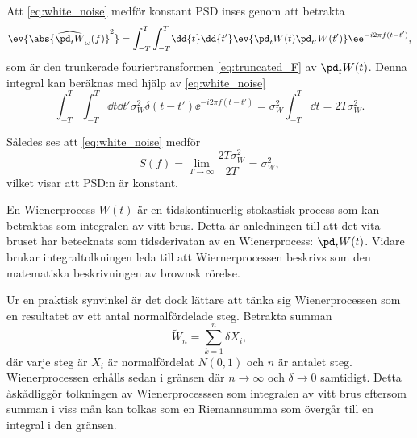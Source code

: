 Att \eqref{eq:white_noise} medför konstant PSD inses genom att betrakta
\begin{equation}
    \ev{\abs{\widehat{\pd_tW}_\omega(f)}^2} =
    \int_{-T}^{T}\int_{-T}^{T}\!\dd{t}\dd{t'}
    \ev{\pd_tW(t)\pd_{t'}W(t')}\ee^{-i2\pi f(t-t')},
\end{equation}
som är den trunkerade fouriertransformen \eqref{eq:truncated_F} av $\pd_tW(t)$. Denna integral kan beräknas med hjälp av \eqref{eq:white_noise}
\begin{equation}
    \int_{-T}^{T}\int_{-T}^{T}\!\dd{t}\dd{t'} 
    \sigma_W^2 \delta(t-t')\ee^{-i2\pi f(t-t')} 
    = \sigma_W^2 \int_{-T}^{T}\dd{t} =2T\sigma_W^2.
\end{equation}

Således ses att \eqref{eq:white_noise} medför 
\begin{equation} \label{eq:white-noise_PSD}
    S(f) = \lim_{T\to\infty}\dfrac{2T\sigma_W^2}{2T} = \sigma_W^2,
\end{equation}
vilket visar att PSD:n är konstant. 



En Wienerprocess $W(t)$ är en tidskontinuerlig stokastisk process som kan betraktas som integralen av vitt brus\cite{Miller_probability2012}. Detta är anledningen till att det vita bruset har betecknats som tidsderivatan av en Wienerprocess: $\pd_tW(t)$. Vidare brukar integraltolkningen leda till att Wiernerprocessen beskrivs som den matematiska beskrivningen av brownsk rörelse. 

Ur en praktisk synvinkel är det dock lättare att tänka sig Wienerprocessen som en resultatet av ett antal normalfördelade steg. Betrakta summan
\begin{equation}\label{eq:wiener_approx}
\tilde{W}_n = \sum_{k=1}^{n} \delta X_i,
\end{equation}
där varje steg är $X_i$ är normalfördelat $N(0,1)$ och $n$ är antalet steg. 
Wienerprocessen erhålls sedan i gränsen där $n\to\infty$ och $\delta\to 0$ samtidigt\cite{Miller_probability2012}. Detta åskådliggör tolkningen av Wienerprocesssen som integralen av vitt brus eftersom summan i viss mån kan tolkas som en Riemannsumma som övergår till en integral i den gränsen.

